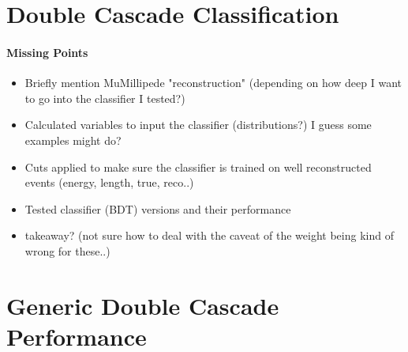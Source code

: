 


\section{Double Cascade Classification}

\paragraph{Missing Points}
\begin{itemize}
    \item Briefly mention MuMillipede "reconstruction" (depending on how deep I want to go into the classifier I tested?)
    \item Calculated variables to input the classifier (distributions?) I guess some examples might do?
    \item Cuts applied to make sure the classifier is trained on well reconstructed events (energy, length, true, reco..)
    \item Tested classifier (BDT) versions and their performance
    \item takeaway? (not sure how to deal with the caveat of the weight being kind of wrong for these..)
\end{itemize}


\section{Generic Double Cascade Performance}


